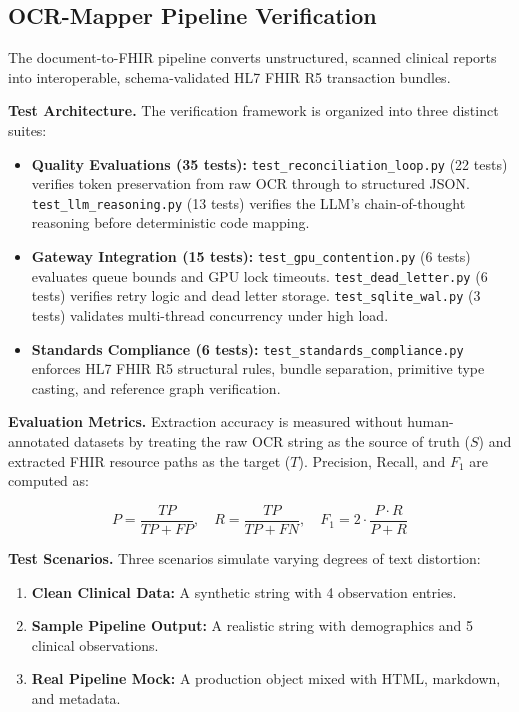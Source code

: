 \subsection{OCR-Mapper Pipeline Verification}
\label{sec:ai_testing}

The document-to-FHIR pipeline converts unstructured, scanned clinical reports into interoperable, schema-validated HL7 FHIR R5 transaction bundles.

\textbf{Test Architecture.}
The verification framework is organized into three distinct suites:
\begin{itemize}
    \item \textbf{Quality Evaluations (35 tests):} \texttt{test\_reconciliation\_loop.py}
    (22 tests) verifies token preservation from raw OCR through to structured
    JSON\@.\newline
    \texttt{test\_llm\_reasoning.py} (13 tests) verifies the LLM's chain-of-thought
    reasoning before deterministic code mapping.
    \item \textbf{Gateway Integration (15 tests):} \texttt{test\_gpu\_contention.py} (6 tests) evaluates queue bounds and GPU lock timeouts. \texttt{test\_dead\_letter.py} (6 tests) verifies retry logic and dead letter storage. \texttt{test\_sqlite\_wal.py} (3 tests) validates multi-thread concurrency under high load.
    \item \textbf{Standards Compliance (6 tests):} \texttt{test\_standards\_compliance.py} enforces HL7 FHIR R5 structural rules, bundle separation, primitive type casting, and reference graph verification.
\end{itemize}

\textbf{Evaluation Metrics.}
Extraction accuracy is measured without human-annotated datasets by treating the raw OCR string as the source of truth ($S$) and extracted FHIR resource paths as the target ($T$). Precision, Recall, and $F_1$ are computed as:

\[
P = \frac{TP}{TP + FP},\quad
R = \frac{TP}{TP + FN},\quad
F_1 = 2\cdot\frac{P \cdot R}{P + R}
\]

\textbf{Test Scenarios.}
Three scenarios simulate varying degrees of text distortion:
\begin{enumerate}
    \item \textbf{Clean Clinical Data:} A synthetic string with 4 observation entries. 
    \item \textbf{Sample Pipeline Output:} A realistic string with demographics and 5 clinical observations.
    \item \textbf{Real Pipeline Mock:} A production object mixed with HTML, markdown, and metadata.
\end{enumerate}



